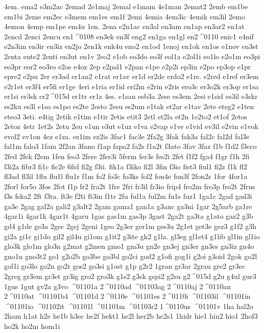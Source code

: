 {4em.
ema2
e3m2ac
2emad
2e1maj
2emal
e1mam
4e1man
2emat2
2emb
em1be
em1bi
2eme
em2ec
e3mem
em1es
em1f
2emi
4emia
4em3ic
4emik
em3il
2emo
4emon
4emp
em1pe
em4u
1en.
2ena
e2n1ac
en3al
en3am
en1ap
en3ar2
en1at
2encd
2enci
2encu
en1^^^^0108
en3ek
en3f
eng2
en1ga
en1gl
en2^^^^0110
enic1
e4nif
e2n3im
en3ir
en3iz
en2jo
2en1k
enk4u
eno2
en1od
1enoj
en1ok
en1os
e1nov
en3st
2enta
ente2
2enti
en3ut
en1v
2eo2
e1ob
eo3do
eo3f
eol1a
e2ol1i
eo1lo
e2o1m
eo3pi
eo3pr
eor2
eo3ro
e2os
e4oz
2ep
e2pal1
e2pan
e1pe
e2p2i
ep3in
e2po
ep3op
e1pr
epre2
e2pu
2er
er3ad
er1an2
e1rat
er1av
er1d
er2de
erdo2
e1re.
e2red
e1ref
er3em
e2r1et
er3f4
er5fi
er1ge
4eri
e1ria
er1id
eri2m
e2rin
e2ris
ero3c
er3o2k
er3op
er1sa
er1si
er3sk
er2^^^^015d
er1tr
er1z
4es.
e1san
esb3a
2ese
es3em
2esi
e1sid
es3il
e3skr
es2ku
es3l
e1so
es1po
es2te
2esto
2esu
es2um
e1tak
et2ar
e1tav
2ete
eteg2
e1ten
eteo3
3eti.
e4tig
2etik
e1tim
e1tir
2etis
etit3
2etl
et2la
et2n
1e2to2
et1of
2etos
2etoz
4etr
1et2s
2etu
2eu
e1un
e3ut
e1uz
e1va
e2vap
e1ve
e1vid
ev3il
e2vin
e1vok
evol2
ev1on
4ez
e1za.
ez1im
ez2is
3fac1
fac3e
2fa2g
3fak
fak3a
fal2c
fal2d
fal3e
fal1m
falo3
1fam
2f2an
3fano
f1ap
fapa2
fa2s
f1a2t
f3ato
3fav
3faz
f1b
f1d2
f3eco
2fed
2fek
f2em
1fen
feo3
2fere
2fer3i
5ferm
fer3s
fes2i
2fet
f1f2
fga4
f1gr
f1h
2fi
f3i2a
fibr3
fi1c
fic2e
6fid
fi2g
f3ii.
fik1a
f3iko
fi2l
3fin
f3io
fist3
fiul1
fi2z
f1k
fl2
fl3ad
fl3il
1flu
flu1l
flu1r
f1m
fo2
fo3c
fo3ks
fol2
fon4e
fon3f
2fon2s
1for
4for1a
2forl
for5o
3fos
2fot
f1p
fr2
fra2t
1fre
2fri
fr3il
fr3io
frip4
fro2m
fro3p
fro2t
2frus
f3s
fska2
2ft
f3ta.
ft3e
f2ti
ft3in
f1tr
2fu
ful1a
ful2m
fu1s
fuz1
1ga1c
2gad
gad3i
ga3e
2gag
gal2a
gali2
g3alt2
2gam
gama1
gan1a
g3anc
ga3ni
1gar
2g5arb
ga1re
4gar1i
4gar1k
4gar1t
4garu
1gas
gas1m
gas3p
3gast
2ga2t
ga3ta
g1ato
gaz2
g3b
gd4
g1de
ge3a
2gec
2gej
2geni
1geo
2g3er
ger1m
ges3u
2g1et
get3e
gez3
g1f2
g3h
gi2a
gi1c
gi1do
gil2
gil4u
gi1om
g1it2
g3ite
gk2
g1la.
gl3eg
gl1et4
g1lib
gl1in
gl1io
glo3k
glo1m
glo3n
g2mat
g2men
gmo1
gm3u
gn2e
gn3ej
gn3er
gn3es
gn3iz
gn4o
gno1n
gno3t2
go1
g2o2b
go3be
go3bl
go2ci
god2
g1ofi
gog1i
g2oi
g3oid
2gok
go2l
gol1i
go3lo
go2n
go2r
gos2
go3si
g1ost
g1p
g2r2
1gran
gr3ar
2grau
gre2
gr3ec
2greg
gr3em
gr3et
gr3ig
gro2
gro3k
g1s2
g3sk
gspi2
g2su
g2^^^^015d
g2u
g4ul
gur3
1gus
1gut
gv2a
g3vo
^^^^01101a
2^^^^0110ad
^^^^01103ag
2^^^^0110aj
2^^^^0110an
2^^^^0110at
^^^^01101b4
^^^^01101d
2^^^^0110e
^^^^01101es
2^^^^0110i
^^^^01103il
^^^^01101in
^^^^01101io
^^^^01102it
^^^^01101l
^^^^01101m
^^^^01103r2
1^^^^0110us
^^^^01101v
1ha
hal2o
2ham
h1at
h2e
he1b
h3ec
he2f
hekt1
he2l
her2b
he2s1
1hidr
hie1
hin2
hio1
2hof3
ho2k
ho2m
hom1i
}
